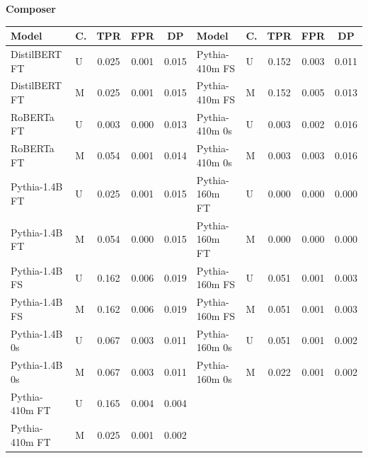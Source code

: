 \documentclass[11pt]{article}
\begin{document}
\vspace{4pt}\noindent\textbf{Composer}
\begin{center}\scriptsize
\begin{tabular}{llccc|llccc}
\toprule
\textbf{Model} & \textbf{C.} & \textbf{TPR} & \textbf{FPR} & \textbf{DP} & \textbf{Model} & \textbf{C.} & \textbf{TPR} & \textbf{FPR} & \textbf{DP} \\
\midrule
DistilBERT FT & U & 0.025 & 0.001 & 0.015 & Pythia-410m FS & U & 0.152 & 0.003 & 0.011 \\
DistilBERT FT & M & 0.025 & 0.001 & 0.015 & Pythia-410m FS & M & 0.152 & 0.005 & 0.013 \\
RoBERTa FT & U & 0.003 & 0.000 & 0.013 & Pythia-410m 0s & U & 0.003 & 0.002 & 0.016 \\
RoBERTa FT & M & 0.054 & 0.001 & 0.014 & Pythia-410m 0s & M & 0.003 & 0.003 & 0.016 \\
Pythia-1.4B FT & U & 0.025 & 0.001 & 0.015 & Pythia-160m FT & U & 0.000 & 0.000 & 0.000 \\
Pythia-1.4B FT & M & 0.054 & 0.000 & 0.015 & Pythia-160m FT & M & 0.000 & 0.000 & 0.000 \\
Pythia-1.4B FS & U & 0.162 & 0.006 & 0.019 & Pythia-160m FS & U & 0.051 & 0.001 & 0.003 \\
Pythia-1.4B FS & M & 0.162 & 0.006 & 0.019 & Pythia-160m FS & M & 0.051 & 0.001 & 0.003 \\
Pythia-1.4B 0s & U & 0.067 & 0.003 & 0.011 & Pythia-160m 0s & U & 0.051 & 0.001 & 0.002 \\
Pythia-1.4B 0s & M & 0.067 & 0.003 & 0.011 & Pythia-160m 0s & M & 0.022 & 0.001 & 0.002 \\
Pythia-410m FT & U & 0.165 & 0.004 & 0.004 & & & & & \\
Pythia-410m FT & M & 0.025 & 0.001 & 0.002 & & & & & \\
\bottomrule
\end{tabular}
\end{center}
\end{document}
